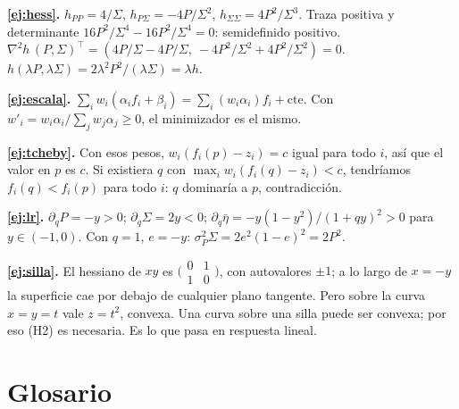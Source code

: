 \textbf{\ref{ej:hess}.} $h_{PP} = 4/\Sigma$, $h_{P\Sigma} = -4P/\Sigma^2$, $h_{\Sigma\Sigma} = 4P^2/\Sigma^3$.
Traza positiva y determinante $16P^2/\Sigma^4 - 16P^2/\Sigma^4 = 0$: semidefinido positivo.
$\nabla^2h\,(P,\Sigma)^\top = (4P/\Sigma - 4P/\Sigma,\ -4P^2/\Sigma^2 + 4P^2/\Sigma^2) = 0$.
$h(\lambda P,\lambda\Sigma) = 2\lambda^2P^2/(\lambda\Sigma) = \lambda h$.

\textbf{\ref{ej:escala}.} $\sum_iw_i(\alpha_if_i + \beta_i) = \sum_i(w_i\alpha_i)f_i + \text{cte}$.
Con $w'_i = w_i\alpha_i/\sum_jw_j\alpha_j \ge 0$, el minimizador es el mismo.

\textbf{\ref{ej:tcheby}.} Con esos pesos, $w_i(f_i(p) - z_i) = c$ igual para todo $i$, así que el
valor en $p$ es $c$. Si existiera $q$ con $\max_iw_i(f_i(q) - z_i) < c$, tendríamos
$f_i(q) < f_i(p)$ para todo $i$: $q$ dominaría a $p$, contradicción.

\textbf{\ref{ej:lr}.} $\partial_qP = -y > 0$; $\partial_q\Sigma = 2y < 0$;
$\partial_q\bar\eta = -y(1-y^2)/(1+qy)^2 > 0$ para $y\in(-1,0)$. Con $q = 1$, $e = -y$:
$\sigma_P^2\Sigma = 2e^2(1-e)^2 = 2P^2$.

\textbf{\ref{ej:silla}.} El hessiano de $xy$ es $\bigl(\begin{smallmatrix}0&1\\1&0\end{smallmatrix}\bigr)$,
con autovalores $\pm1$; a lo largo de $x = -y$ la superficie cae por debajo de cualquier plano
tangente. Pero sobre la curva $x = y = t$ vale $z = t^2$, convexa. Una curva sobre una silla puede ser
convexa; por eso (H2) es necesaria. Es lo que pasa en respuesta lineal.

\section{Glosario}

